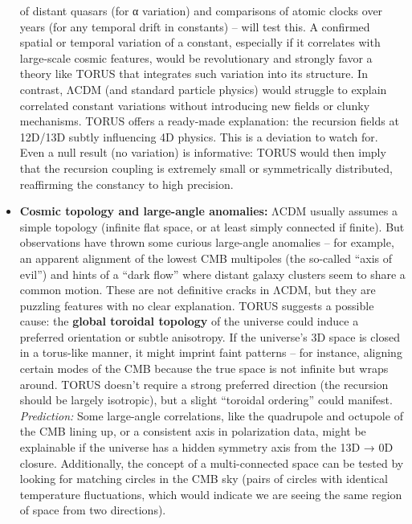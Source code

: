 \documentclass[
]{article}
\begin{document}
\begin{itemize}
  of distant quasars (for α variation) and comparisons of atomic clocks
  over years (for any temporal drift in constants) -- will test
  this\hspace{0pt}. A confirmed spatial or temporal variation of a
  constant, especially if it correlates with large-scale cosmic
  features, would be revolutionary and strongly favor a theory like
  TORUS that integrates such variation into its structure. In contrast,
  ΛCDM (and standard particle physics) would struggle to explain
  correlated constant variations without introducing new fields or
  clunky mechanisms. TORUS offers a ready-made explanation: the
  recursion fields at 12D/13D subtly influencing 4D physics\hspace{0pt}.
  This is a deviation to watch for. Even a null result (no variation) is
  informative: TORUS would then imply that the recursion coupling is
  extremely small or symmetrically distributed, reaffirming the
  constancy to high precision.
\item
  \textbf{Cosmic topology and large-angle anomalies:} ΛCDM usually
  assumes a simple topology (infinite flat space, or at least simply
  connected if finite). But observations have thrown some curious
  large-angle anomalies -- for example, an apparent alignment of the
  lowest CMB multipoles (the so-called ``axis of evil'') and hints of a
  ``dark flow'' where distant galaxy clusters seem to share a common
  motion. These are not definitive cracks in ΛCDM, but they are puzzling
  features with no clear explanation. TORUS suggests a possible cause:
  the \textbf{global toroidal topology} of the universe could induce a
  preferred orientation or subtle anisotropy. If the universe's 3D space
  is closed in a torus-like manner, it might imprint faint patterns --
  for instance, aligning certain modes of the CMB because the true space
  is not infinite but wraps around. TORUS doesn't require a strong
  preferred direction (the recursion should be largely isotropic), but a
  slight ``toroidal ordering'' could manifest. \emph{Prediction:} Some
  large-angle correlations, like the quadrupole and octupole of the CMB
  lining up, or a consistent axis in polarization data, might be
  explainable if the universe has a hidden symmetry axis from the 13D →
  0D closure\hspace{0pt}. Additionally, the concept of a multi-connected
  space can be tested by looking for matching circles in the CMB sky
  (pairs of circles with identical temperature fluctuations, which would
  indicate we are seeing the same region of space from two directions).

\end{itemize}
\end{document}
